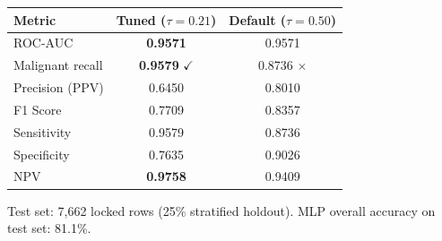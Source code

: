 \documentclass[12pt, a4paper]{article}
\begin{document}
\begin{center}
\begin{tabular}{@{} lcc @{}}
\toprule
Metric & Tuned ($\tau = 0.21$) & Default ($\tau = 0.50$) \\
\midrule
ROC-AUC          & \textbf{0.9571} & 0.9571 \\
Malignant recall & \textbf{0.9579} $\checkmark$ & 0.8736 $\times$ \\
Precision (PPV)  & 0.6450 & 0.8010 \\
F1 Score         & 0.7709 & 0.8357 \\
Sensitivity      & 0.9579 & 0.8736 \\
Specificity      & 0.7635 & 0.9026 \\
NPV              & \textbf{0.9758} & 0.9409 \\
\bottomrule
\end{tabular}
\end{center}

\vspace{0.5em}
{\small\color{gray}
Test set: 7{,}662 locked rows (25\% stratified holdout).
MLP overall accuracy on test set: 81.1\%.
}
\end{document}

